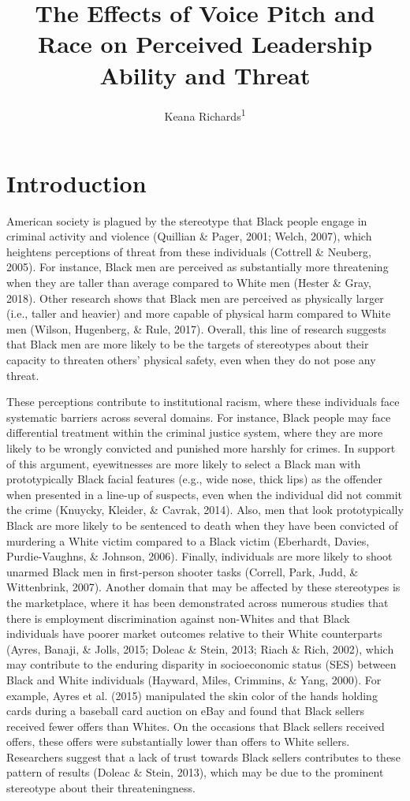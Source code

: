 \documentclass[
  english,
  man, noextraspace,floatsintext]{apa6}
\title{The Effects of Voice Pitch and Race on Perceived Leadership Ability and Threat}
\author{Keana Richards\textsuperscript{1}}
\date{}
\affiliation{\vspace{0.5cm}\textsuperscript{1} University of Pennsylvania}
\begin{document}
\maketitle

\raggedbottom

\hypertarget{introduction}{%
\section{Introduction}\label{introduction}}

American society is plagued by the stereotype that Black people engage in criminal activity and violence (Quillian \& Pager, 2001; Welch, 2007), which heightens perceptions of threat from these individuals (Cottrell \& Neuberg, 2005). For instance, Black men are perceived as substantially more threatening when they are taller than average compared to White men (Hester \& Gray, 2018). Other research shows that Black men are perceived as physically larger (i.e., taller and heavier) and more capable of physical harm compared to White men (Wilson, Hugenberg, \& Rule, 2017). Overall, this line of research suggests that Black men are more likely to be the targets of stereotypes about their capacity to threaten others' physical safety, even when they do not pose any threat.

These perceptions contribute to institutional racism, where these individuals face systematic barriers across several domains. For instance, Black people may face differential treatment within the criminal justice system, where they are more likely to be wrongly convicted and punished more harshly for crimes. In support of this argument, eyewitnesses are more likely to select a Black man with prototypically Black facial features (e.g., wide nose, thick lips) as the offender when presented in a line-up of suspects, even when the individual did not commit the crime (Knuycky, Kleider, \& Cavrak, 2014). Also, men that look prototypically Black are more likely to be sentenced to death when they have been convicted of murdering a White victim compared to a Black victim (Eberhardt, Davies, Purdie-Vaughns, \& Johnson, 2006). Finally, individuals are more likely to shoot unarmed Black men in first-person shooter tasks (Correll, Park, Judd, \& Wittenbrink, 2007). Another domain that may be affected by these stereotypes is the marketplace, where it has been demonstrated across numerous studies that there is employment discrimination against non-Whites and that Black individuals have poorer market outcomes relative to their White counterparts (Ayres, Banaji, \& Jolls, 2015; Doleac \& Stein, 2013; Riach \& Rich, 2002), which may contribute to the enduring disparity in socioeconomic status (SES) between Black and White individuals (Hayward, Miles, Crimmins, \& Yang, 2000). For example, Ayres et al. (2015) manipulated the skin color of the hands holding cards during a baseball card auction on eBay and found that Black sellers received fewer offers than Whites. On the occasions that Black sellers received offers, these offers were substantially lower than offers to White sellers. Researchers suggest that a lack of trust towards Black sellers contributes to these pattern of results (Doleac \& Stein, 2013), which may be due to the prominent stereotype about their threateningness.
\end{document}
